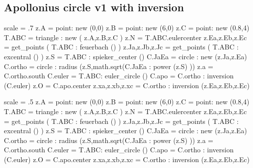 \subsection{Apollonius circle v1 with inversion} %
\label{sub:apollonius_circle_v1_with_inversion}
\begin{tkzexample}
\begin{tkzelements}
   scale             = .7
   z.A               = point: new (0,0)
   z.B               = point: new (6,0)
   z.C               = point: new (0.8,4)
   T.ABC             = triangle : new ( z.A,z.B,z.C )
   z.N               = T.ABC.eulercenter
   z.Ea,z.Eb,z.Ec    = get_points ( T.ABC : feuerbach () )
   z.Ja,z.Jb,z.Jc    = get_points ( T.ABC : excentral () )
   z.S               = T.ABC : spieker_center ()
   C.JaEa            = circle : new (z.Ja,z.Ea)
   C.ortho           = circle : radius (z.S,math.sqrt(C.JaEa : power (z.S) ))
   z.a               = C.ortho.south
   C.euler           = T.ABC: euler_circle ()
   C.apo             = C.ortho : inversion (C.euler)
   z.O               = C.apo.center
   z.xa,z.xb,z.xc    = C.ortho : inversion (z.Ea,z.Eb,z.Ec)
\end{tkzelements}
\end{tkzexample}

\begin{tkzelements}
   scale             = .5
   z.A               = point: new (0,0)
   z.B               = point: new (6,0)
   z.C               = point: new (0.8,4)
   T.ABC             = triangle : new ( z.A,z.B,z.C )
   z.N               = T.ABC.eulercenter
   z.Ea,z.Eb,z.Ec    = get_points ( T.ABC : feuerbach () )
   z.Ja,z.Jb,z.Jc    = get_points ( T.ABC : excentral () )
   z.S               = T.ABC : spieker_center ()
   C.JaEa            = circle : new (z.Ja,z.Ea)
   C.ortho           = circle : radius (z.S,math.sqrt(C.JaEa : power (z.S) ))
   z.a               = C.ortho.south
   C.euler           = T.ABC: euler_circle ()
   C.apo             = C.ortho : inversion (C.euler)
   z.O               = C.apo.center
   z.xa,z.xb,z.xc    = C.ortho : inversion (z.Ea,z.Eb,z.Ec)
\end{tkzelements}

